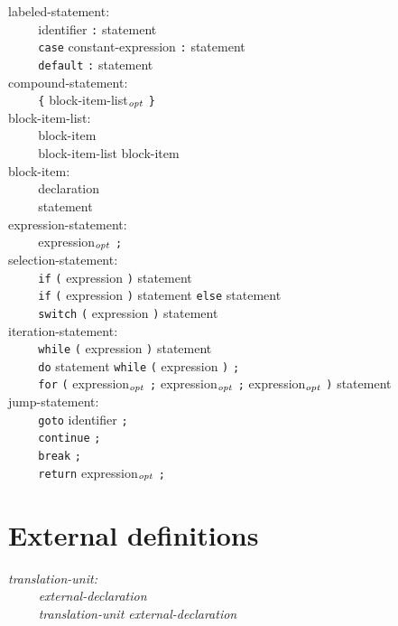 \documentclass[12pt]{report}
\def\|{\verb|}
\newcommand\opt{$_{{\it opt}}$ }
\begin{document}
\noindent
labeled-statement:\\
\|    | identifier \verb+:+ statement\\
\|    | \verb+case+ constant-expression \verb+:+ statement\\
\|    | \verb+default+ \verb+:+ statement\\

\noindent
compound-statement:\\
\|    | \verb+{+ block-item-list\opt \verb+}+\\

\noindent
block-item-list:\\
\|    | block-item\\
\|    | block-item-list block-item\\

\noindent
block-item:\\
\|    | declaration\\
\|    | statement\\

\noindent
expression-statement:\\
\|    | expression\opt \verb+;+\\

\noindent
selection-statement:\\
\|    | \verb+if+ \verb+(+ expression \verb+)+ statement\\
\|    | \verb+if+ \verb+(+ expression \verb+)+ statement \verb+else+ statement\\
\|    | \verb+switch+ \verb+(+ expression \verb+)+ statement\\

\noindent
iteration-statement:\\
\|    | \verb+while+ \verb+(+ expression \verb+)+ statement\\
\|    | \verb+do+ statement \verb+while+ \verb+(+ expression \verb+)+ \verb+;+\\
\|    | \verb+for+ \verb+(+ expression\opt \verb+;+ expression\opt \verb+;+ expression\opt \verb+)+ statement\\

\noindent
jump-statement:\\
\|    | \verb+goto+ identifier \verb+;+\\
\|    | \verb+continue+ \verb+;+\\
\|    | \verb+break+ \verb+;+\\
\|    | \verb+return+ expression\opt \verb+;+\\

\rm
\section{External definitions}
\it
\noindent
translation-unit:\\
\|    | external-declaration\\
\|    | translation-unit external-declaration\\
\end{document}

